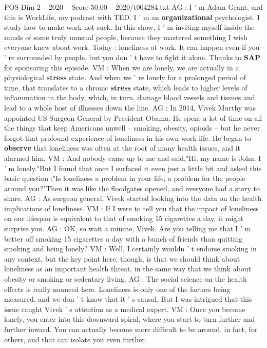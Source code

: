 \begin{textsample}{POS Dim 2 – 2020 – Score 50.00 – 2020/t004284.txt}
AG : I ' m Adam Grant, and this is WorkLife, my podcast with TED.
I ' m an \textbf{organizational} psychologist.
I study how to make work not suck.
In this show, I ' m inviting myself inside the minds of some truly unusual people, because they mastered something I wish everyone knew about work.
Today : loneliness at work.
It can happen even if you ' re surrounded by people, but you don ' t have to fight it alone.
Thanks to \textbf{SAP} for sponsoring this episode.
VM : When we are lonely, we are actually in a physiological \textbf{stress} state.
And when we ' re lonely for a prolonged period of time, that translates to a chronic \textbf{stress} state, which leads to higher levels of inflammation in the body, which, in turn, damage blood vessels and tissues and lead to a whole host of illnesses down the line.
AG : In 2014, Vivek Murthy was appointed US Surgeon General by President Obama.
He spent a lot of time on all the things that keep Americans unwell -- smoking, obesity, opioids -- but he never forgot that profound experience of loneliness in his own work life.
He began to \textbf{observe} that loneliness was often at the root of many health issues, and it alarmed him.
VM : And nobody came up to me and said,"Hi, my name is John.
I ' m lonely."But I found that once I surfaced it even just a little bit and asked this basic question :"Is loneliness a problem in your life, a problem for the people around you?"Then it was like the floodgates opened, and everyone had a story to share.
AG : As surgeon general, Vivek started looking into the data on the health implications of loneliness.
VM : If I were to tell you that the impact of loneliness on our lifespan is equivalent to that of smoking 15 cigarettes a day, it might surprise you.
AG : OK, so wait a minute, Vivek.
Are you telling me that I ' m better off smoking 15 cigarettes a day with a bunch of friends than quitting smoking and being lonely?
VM : Well, I certainly wouldn ' t endorse smoking in any context, but the key point here, though, is that we should think about loneliness as an important health threat, in the same way that we think about obesity or smoking or sedentary living.
AG : The social science on the health effects is really nuanced here.
Loneliness is only one of the factors being measured, and we don ' t know that it ' s causal.
But I was intrigued that this issue caught Vivek ' s attention as a medical expert.
VM : Once you become lonely, you enter into this downward spiral, where you start to turn further and further inward.
You can actually become more difficult to be around, in fact, for others, and that can isolate you even further.

\end{textsample}
